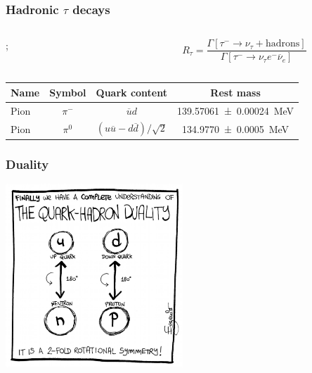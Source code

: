 \documentclass[fleqn]{beamer}
\begin{document}
\begin{frame}
  \frametitle{Hadronic \(\tau\) decays}
  \begin{columns}
    \begin{column}{0.4\textwidth}
      ;
    \end{column}

    \pause
    \begin{column}{0.6\textwidth}
      \begin{equation}
        R_\tau = \frac{\Gamma[\tau^- \to \nu_\tau + \text{hadrons}]}{\Gamma[\tau^- \to \nu_\tau e^- \overline{\nu}_{e}]}
      \end{equation}
    \end{column}
  \end{columns}

  \vspace{1cm}
  
  \pause
  \centering
  \begin{tabular}{lccc}
    \toprule
    Name & Symbol & Quark content & Rest mass \\
    \midrule
    Pion & \(\pi^-\) & \(\overline{u} d\) & \SI{139.57061 \pm 0.00024}{\mega\eV}  \\
    Pion & \(\pi^0\) & \((u \overline{u} - d \overline{d})/\sqrt{2}\) & \SI{134.9770\pm0.0005}{\mega\eV}
  \end{tabular}
\end{frame}
\begin{frame}
  \frametitle{Duality}
  \centering
  \includegraphics[width=0.5\textwidth]{./images/quarkHadronDuality.eps}
\end{frame}
\end{document}
